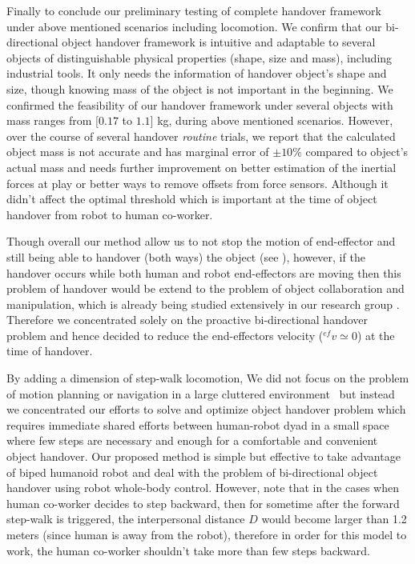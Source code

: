 Finally to conclude our preliminary testing of complete handover framework under above mentioned scenarios including locomotion. We confirm that our bi-directional object handover framework is intuitive and adaptable to several objects of distinguishable physical properties (shape, size and mass), including  industrial tools. It only needs the information of handover object's shape and size, though knowing mass of the object is not important in the beginning. We confirmed the feasibility of our handover framework under several objects with mass ranges from [$0.17$ to $1.1$] kg, during above mentioned scenarios. However, over the course of several handover \textit{routine} trials, we report that the calculated object mass is not accurate and has marginal error of $ \pm10 $\% compared to object's actual mass and needs further improvement on better estimation of the inertial forces at play or  better ways to remove offsets from force sensors. Although it didn't affect the optimal threshold which is important at the time of object handover from robot to human co-worker.

Though overall our method allow us to not stop the motion of end-effector and still being able to handover (both ways) the object (see ), however, if the handover occurs while both human and robot end-effectors are moving then this problem of handover would be extend to the problem of object collaboration and manipulation, which is already being studied extensively in our research group \cite{bussy2012proactive, agravante2016walking, agravante2013human, bussy2012human, agravante2014collaborative, Agravante2019}. Therefore we concentrated solely on the proactive bi-directional handover problem and hence decided to reduce the end-effectors velocity (${}^{ef}v\simeq0$) at the time of handover. 

By adding a dimension of step-walk locomotion, We did not focus on the problem of motion planning or navigation in a large cluttered environment~\cite{mainprice2012sharing, vahrenkamp2009humanoid, kim2004advanced} but instead we concentrated our efforts to solve and optimize object handover problem which requires immediate shared efforts between human-robot dyad in a small space where few steps are necessary and enough for a comfortable and convenient object handover. Our proposed method is simple but effective to take advantage of biped humanoid robot and deal with the problem of bi-directional object handover using robot whole-body control. However, note that in the cases when human co-worker decides to step backward, then for sometime after the forward step-walk is triggered, the interpersonal distance $ D $ would become larger than 1.2 meters (since human is away from the robot), therefore in order for this model to work, the human co-worker shouldn't take more than few steps backward. 

